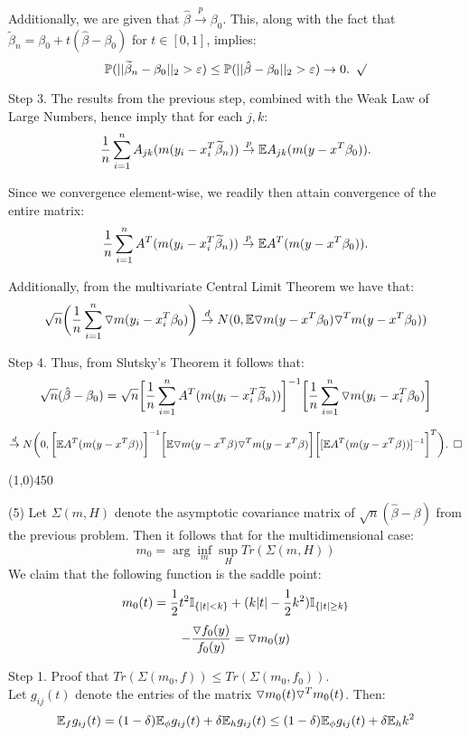 \documentclass[12pt]{article}
\begin{document}
\noindent
Additionally, we are given that $\hat{\beta} \overset{p}\to \beta_0$. This, along with the fact that $\widetilde{\beta}_n = \beta_0+t(\hat{\beta}-\beta_0)$ for $t \in [0,1]$, implies:
$$\mathbb{P}(||\widetilde{\beta}_n-\beta_0||_2 > \varepsilon)
\leq \mathbb{P}(||\hat{\beta}-\beta_0||_2 > \varepsilon)
\to 0. \hspace{5 pt} \surd$$

\noindent
Step 3. The results from the previous step, combined with the Weak Law of Large Numbers, hence imply that for each $j,k$:
$$\frac{1}{n} \sum_{i=1}^n A_{jk}(m(y_i-x_i^T\widetilde\beta_n)) \overset{p}\to \mathbb{E} A_{jk}(m(y-x^T\beta_0)).$$

\noindent
Since we convergence element-wise, we readily then attain convergence of the entire matrix:
$$\frac{1}{n} \sum_{i=1}^n A^T(m(y_i-x_i^T\widetilde\beta_n)) \overset{p}\to \mathbb{E} A^T(m(y-x^T\beta_0)).$$

\noindent
Additionally, from the multivariate Central Limit Theorem we have that:
$$\sqrt{n} \biggl( \frac{1}{n}\sum_{i=1}^n \triangledown m(y_i-x_i^T \beta_0) \biggr) \overset{d}\to N(0, \mathbb{E} \triangledown m(y-x^T\beta_0) \triangledown^T m(y-x^T\beta_0))$$

\noindent
Step 4. Thus, from Slutsky's Theorem it follows that:
$$\sqrt{n}(\hat{\beta}-\beta_0) 
= \sqrt{n} \biggl[ \frac{1}{n} \sum_{i=1}^n A^T(m(y_i-x_i^T\widetilde\beta_n)) \biggr]^{-1}
\biggl[ \frac{1}{n}\sum_{i=1}^n \triangledown m(y_i-x_i^T\beta_0) \biggr]$$

$$\overset{d}\to N\biggl(0, \biggl[ \mathbb{E} A^T(m(y-x^T\beta)) \biggr]^{-1} 
\biggl[ \mathbb{E} \triangledown m (y-x^T\beta) \triangledown^T m(y-x^T\beta) \biggr] 
\biggl[ [\mathbb{E} A^T(m(y-x^T\beta))]^{-1} \biggr]^T \biggr).
 \hspace{5 pt} \square$$

\begin{center}
\line(1,0){450}
\end{center}

\pagebreak
\noindent
(5) Let $\Sigma(m,H)$ denote the asymptotic covariance matrix of $\sqrt{n}(\hat{\beta}-\beta)$ from the previous problem. Then it follows that for the multidimensional case:
$$m_0 = \arg \inf_m \sup_H Tr(\Sigma(m,H))$$
We claim that the following function is the saddle point:
$$m_0(t) = \frac{1}{2}t^2 \mathbb{I}_{\{|t|<k\}} + (k|t|-\frac{1}{2}k^2)\mathbb{I}_{\{|t| \geq k\}}$$
$$-\frac{\triangledown f_0(y)}{f_0(y)} = \triangledown m_0(y)$$

\noindent
Step 1. Proof that $Tr(\Sigma(m_0,f)) \leq Tr(\Sigma(m_0,f_0))$.\\
Let $g_{ij}(t)$ denote the entries of the matrix  $\triangledown m_0(t) \triangledown^Tm_0(t)$. Then:
$$\mathbb{E}_f g_{ij}(t)
= (1-\delta) \mathbb{E}_\phi g_{ij}(t)+\delta \mathbb{E}_h g_{ij}(t)
\leq (1-\delta) \mathbb{E}_\phi g_{ij}(t)+\delta \mathbb{E}_h k^2$$
\end{document}
